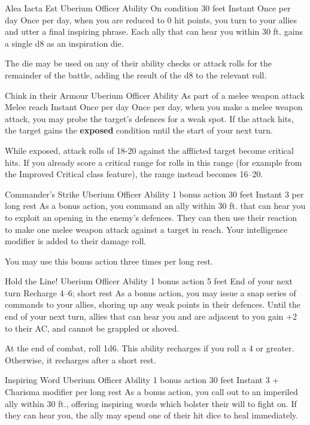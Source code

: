 \ability%
    {Alea Iacta Est}
    {Uberium Officer Ability}
    {On condition}
    {30 feet}
    {Instant}
    {Once per day}
Once per day,
when you are reduced to 0 hit points,
you turn to your allies and utter a final inspiring phrase.
Each ally that can hear you within 30 ft.
gains a single d8 as an inspiration die.

The die may be used on any of their
ability checks or attack rolls
for the remainder of the battle,
adding the result of the d8 to the relevant roll.

\ability%
    {Chink in their Armour}
    {Uberium Officer Ability}
    {As part of a melee weapon attack}
    {Melee reach}
    {Instant}
    {Once per day}
Once per day,
when you make a melee weapon attack,
you may probe the target's defences for a weak spot.
If the attack hits,
the target gains the \textbf{exposed} condition
until the start of your next turn.

While exposed,
attack rolls of 18-20 against the afflicted target
become critical hits.
If you already score a critical range for rolls in this range
(for example from the Improved Critical class feature),
the range instead becomes 16--20.


\ability%
    {Commander's Strike}
    {Uberium Officer Ability}
    {1 bonus action}
    {30 feet}
    {Instant}
    {3 per long rest}
As a bonus action, you command an ally within 30 ft.
that can hear you to exploit an opening in the enemy's defences.
They can then use their reaction to make one melee weapon attack
against a target in reach.
Your intelligence modifier is added to their damage roll.

You may use this bonus action three times per long rest.


\ability%
    {Hold the Line!}
    {Uberium Officer Ability}
    {1 bonus action}
    {5 feet}
    {End of your next turn}
    {Recharge 4--6; short rest}
As a bonus action,
you may issue a snap series of commands to your allies,
shoring up any weak points in their defences.
Until the end of your next turn,
allies that can hear you and are adjacent to you
gain +2 to their AC, and cannot be grappled or shoved.

At the end of combat, roll 1d6.
This ability recharges if you roll a 4 or greater.
Otherwise, it recharges after a short rest.


\ability%
    {Inspiring Word}
    {Uberium Officer Ability}
    {1 bonus action}
    {30 feet}
    {Instant}
    {3 + Charisma modifier per long rest}
As a bonus action, you call out to an imperiled ally within 30 ft.,
offering inspiring words which bolster their will to fight on.
If they can hear you,
the ally may spend one of their hit dice to heal immediately.

